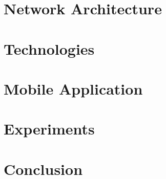 \documentclass[english, a4paper, 11pt, twoside]{article}
\numberwithin{equation}{section} %
\begin{document}
\section{Network Architecture}
    
\clearpage


\section{Technologies}
    
\clearpage

\section{Mobile Application}
    
\clearpage
  
\section{Experiments}
    
\clearpage

\section{Conclusion}
    
\clearpage

\newpage
\renewcommand\refname{References} %
{ %
}


%     
\end{document}
